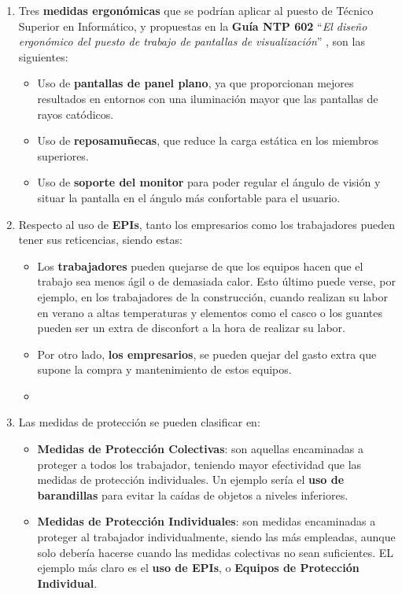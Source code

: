 \begin{enumerate}[label=\alph*.]
    \item Tres \textbf{medidas ergonómicas} que se podrían aplicar al puesto de Técnico Superior en Informático, y propuestas en la \textbf{Guía NTP 602} ``\textit{El diseño ergonómico del puesto de trabajo de pantallas de visualización}'' \cite{ntp602}, son las siguientes:
    \begin{itemize}
        \item Uso de \textbf{pantallas de panel plano}, ya que proporcionan mejores resultados en entornos con una iluminación mayor que las pantallas de rayos catódicos.
        \item Uso de \textbf{reposamuñecas}, que reduce la carga estática en los miembros superiores.
        \item Uso de \textbf{soporte del monitor} para poder regular el ángulo de visión y situar la pantalla en el ángulo más confortable para el usuario.
    \end{itemize}

    \item Respecto al uso de \textbf{EPIs}, tanto los empresarios como los trabajadores pueden tener sus reticencias, siendo estas:
    \begin{itemize}
        \item Los \textbf{trabajadores} pueden quejarse de que los equipos hacen que el trabajo sea menos ágil o de demasiada calor. Esto último puede verse, por ejemplo, en los trabajadores de la construcción, cuando realizan su labor en verano a altas temperaturas y elementos como el casco o los guantes pueden ser un extra de disconfort a la hora de realizar su labor.

        \item Por otro lado, \textbf{los empresarios}, se pueden quejar del gasto extra que supone la compra y mantenimiento de estos equipos.
    \end{itemize}
    \begin{itemize}
        \item
    \end{itemize}

    \item Las medidas de protección se pueden clasificar en:
    \begin{itemize}
        \item \textbf{Medidas de Protección Colectivas}: son aquellas encaminadas a proteger a todos los trabajador, teniendo mayor efectividad que las medidas de protección individuales. Un ejemplo sería el \textbf{uso de barandillas} para evitar la caídas de objetos a niveles inferiores.

        \item \textbf{Medidas de Protección Individuales}: son medidas encaminadas a proteger al trabajador individualmente, siendo las más empleadas, aunque solo debería hacerse cuando las medidas colectivas no sean suficientes. EL ejemplo más claro es el \textbf{uso de EPIs}, o \textbf{Equipos de Protección Individual}.
    \end{itemize}
\end{enumerate}

